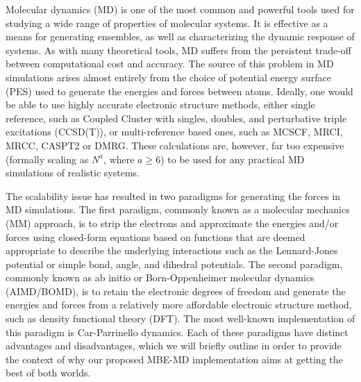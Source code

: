 \documentclass[11pt, proquest]{uwthesis}[2020/02/24]
\begin{document}
\par Molecular dynamics (MD) is one of the most common and powerful tools used for studying a wide range of properties of molecular systems.\autocite{bankura_hydration_2013,bernardi_enhanced_2015,durrant_molecular_2011,hospital_molecular_2015,probst_molecular_1985} It is effective as a means for generating ensembles, as well as characterizing the dynamic response of systems. As with many theoretical tools, MD suffers from the persistent trade-off between computational cost and accuracy. The source of this problem in MD simulations arises almost entirely from the choice of potential energy surface (PES) used to generate the energies and forces between atoms. Ideally, one would be able to use highly accurate electronic structure methods, either single reference, such as Coupled Cluster with singles, doubles, and perturbative triple excitations (CCSD(T)),\autocite{bartlett_coupled-cluster_1989} or multi-reference based ones, such as MCSCF\autocite{schmidt_construction_1998}, MRCI\autocite{werner_selfconsistent_1982}, MRCC\autocite{mukherjee_linked-cluster_1986}, CASPT2\autocite{finley_multi-state_1998} or DMRG.\autocite{schollwock_density-matrix_2005} These calculations are, however, far too expensive (formally scaling as $N^a$, where $a \geq 6$) to be used for any practical MD simulations of realistic systems.

\par The scalability issue has resulted in two paradigms for generating the forces in MD simulations. The first paradigm, commonly known as a molecular mechanics (MM)\autocite{karplus_molecular_2005,karplus_molecular_2002,karplus_molecular_1990,rappe_uff_1992,engler_critical_1973,still_semianalytical_1990} approach, is to strip the electrons and approximate the energies and/or forces using closed-form equations based on functions that are deemed appropriate to describe the underlying interactions such as the Lennard-Jones potential or simple bond, angle, and dihedral potentials. The second paradigm, commonly known as ab initio or Born-Oppenheimer molecular dynamics (AIMD/BOMD),\autocite{car_unified_1985,barnett_born-oppenheimer_1993,worth_beyond_2004,li_ab_2005,tuckerman_ab_1996} is to retain the electronic degrees of freedom and generate the energies and forces from a relatively more affordable electronic structure method, such as density functional theory (DFT). The most well-known implementation of this paradigm is Car-Parrinello dynamics.\autocite{car_unified_1985} Each of these paradigms have distinct advantages and disadvantages, which we will briefly outline in order to provide the context of why our proposed MBE-MD implementation aims at getting the best of both worlds.
\end{document}
